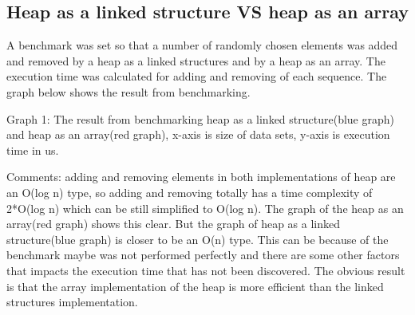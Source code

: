 \documentclass[a4paper,11pt]{article}
\begin{document}
\subsection*{Heap as a linked structure VS heap as an array}
A benchmark was set so that a number of randomly chosen elements was added and removed by a heap as a linked structures and by a heap as an array. The execution time was calculated for adding and removing of each sequence. The graph below shows the result from benchmarking. 
\begin{center}
\newline
\caption{Graph 1: The result from benchmarking heap as a linked structure(blue graph) and heap as an array(red graph), x-axis is size of data sets, y-axis is execution time in us. }
\end{center}\newline
Comments: adding and removing elements in both implementations of heap are an O(log n) type, so adding and removing totally has a time complexity of 2*O(log n) which can be still simplified to O(log n).  The graph of the heap as an array(red graph) shows this clear. But the graph of heap as a linked structure(blue graph) is closer to be an O(n) type. This can be because of the benchmark maybe was not performed perfectly and there are some other factors that impacts the execution time that has not been discovered. The obvious result is that the array implementation of the heap is more efficient than the linked structures implementation.  
\end{document}
